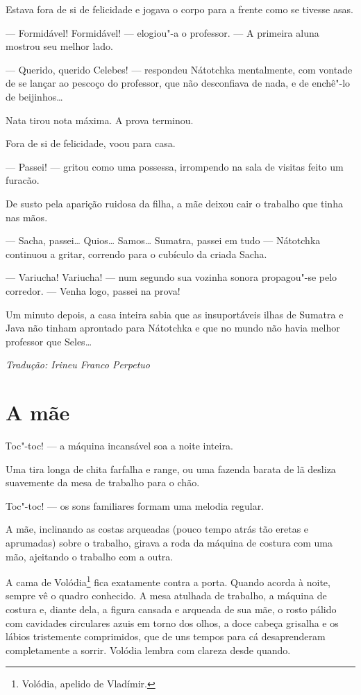 Estava fora de si de felicidade e jogava o corpo para a frente como se
tivesse asas.

--- Formidável! Formidável! --- elogiou"-a o professor. --- A primeira
aluna mostrou seu melhor lado.

--- Querido, querido Celebes! --- respondeu Nátotchka mentalmente, com
vontade de se lançar ao pescoço do professor, que não desconfiava de
nada, e de enchê"-lo de beijinhos\ldots{}

Nata tirou nota máxima. A prova terminou.

Fora de si de felicidade, voou para casa.

--- Passei! --- gritou como uma possessa, irrompendo na sala de visitas
feito um furacão.

De susto pela aparição ruidosa da filha, a mãe deixou cair o trabalho
que tinha nas mãos.

--- Sacha, passei\ldots{} Quios\ldots{} Samos\ldots{} Sumatra, passei em tudo ---
Nátotchka continuou a gritar, correndo para o cubículo da criada Sacha.

--- Variucha! Variucha! --- num segundo sua vozinha sonora propagou"-se
pelo corredor. --- Venha logo, passei na prova!

Um minuto depois, a casa inteira sabia que as insuportáveis ilhas de
Sumatra e Java não tinham aprontado para Nátotchka e que no mundo não
havia melhor professor que Seles\ldots{}

\medskip

{\footnotesize\hfill\emph{Tradução: Irineu Franco Perpetuo}}

\chapter{A mãe} \label{part13}

Тoc"-toc! --- a máquina incansável soa a noite inteira.

Uma tira longa de chita farfalha e range, ou uma fazenda barata de lã
desliza suavemente da mesa de trabalho para o chão.

Toc"-toc! --- os sons familiares formam uma melodia regular.

A mãe, inclinando as costas arqueadas (pouco tempo atrás tão eretas e
aprumadas) sobre o trabalho, girava a roda da máquina de costura com uma
mão, ajeitando o trabalho com a outra.

A cama de Volódia\footnote{Volódia, apelido de Vladímir.} fica
exatamente contra a porta. Quando acorda à noite, sempre vê o quadro
conhecido. A mesa atulhada de trabalho, a máquina de costura e, diante
dela, a figura cansada e arqueada de sua mãe, o rosto pálido com
cavidades circulares azuis em torno dos olhos, a doce cabeça grisalha e
os lábios tristemente comprimidos, que de uns tempos para cá
desaprenderam completamente a sorrir. Volódia lembra com clareza desde
quando.

